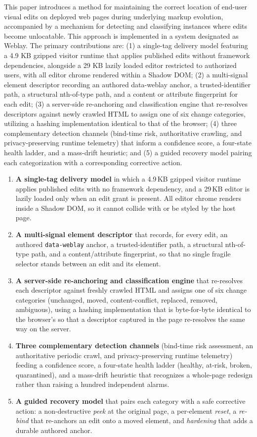 \documentclass[conference]{IEEEtran}
\begin{document}
This paper introduces a method for maintaining the correct location of end-user visual edits on deployed web pages during underlying markup evolution, accompanied by a mechanism for detecting and classifying instances where edits become unlocatable. This approach is implemented in a system designated as Weblay. The primary contributions are: (1) a single-tag delivery model featuring a 4.9 KB gzipped visitor runtime that applies published edits without framework dependencies, alongside a 29 KB lazily loaded editor restricted to authorized users, with all editor chrome rendered within a Shadow DOM; (2) a multi-signal element descriptor recording an authored data-weblay anchor, a trusted-identifier path, a structural nth-of-type path, and a content or attribute fingerprint for each edit; (3) a server-side re-anchoring and classification engine that re-resolves descriptors against newly crawled HTML to assign one of six change categories, utilizing a hashing implementation identical to that of the browser; (4) three complementary detection channels (bind-time risk, authoritative crawling, and privacy-preserving runtime telemetry) that inform a confidence score, a four-state health ladder, and a mass-drift heuristic; and (5) a guided recovery model pairing each categorization with a corresponding corrective action.

\begin{enumerate}
\item \textbf{A single-tag delivery model} in which a 4.9\,KB gzipped visitor runtime applies published edits with no framework dependency, and a 29\,KB editor is lazily loaded only when an edit grant is present. All editor chrome renders inside a Shadow DOM, so it cannot collide with or be styled by the host page.
\item \textbf{A multi-signal element descriptor} that records, for every edit, an authored \texttt{data-weblay} anchor, a trusted-identifier path, a structural nth-of-type path, and a content/attribute fingerprint, so that no single fragile selector stands between an edit and its element.
\item \textbf{A server-side re-anchoring and classification engine} that re-resolves each descriptor against freshly crawled HTML and assigns one of six change categories (unchanged, moved, content-conflict, replaced, removed, ambiguous), using a hashing implementation that is byte-for-byte identical to the browser's so that a descriptor captured in the page re-resolves the same way on the server.
\item \textbf{Three complementary detection channels} (bind-time risk assessment, an authoritative periodic crawl, and privacy-preserving runtime telemetry) feeding a confidence score, a four-state health ladder (healthy, at-risk, broken, quarantined), and a mass-drift heuristic that recognizes a whole-page redesign rather than raising a hundred independent alarms.
\item \textbf{A guided recovery model} that pairs each category with a safe corrective action: a non-destructive \emph{peek} at the original page, a per-element \emph{reset}, a \emph{re-bind} that re-anchors an edit onto a moved element, and \emph{hardening} that adds a durable authored anchor.
\end{enumerate}
\end{document}
